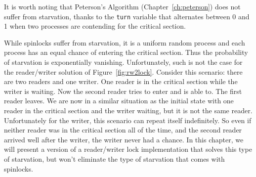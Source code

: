 \documentclass{report}
\begin{document}
It is worth noting that Peterson's Algorithm (Chapter~\ref{ch:peterson})
does not suffer from starvation, thanks to the \texttt{turn} variable
that alternates between 0 and 1 when two processes are contending for
the critical section.

While spinlocks suffer from starvation, it is a uniform random
process and each process has an equal chance of entering the critical
section.  Thus the probability of starvation is exponentially vanishing.
Unfortunately, such is not the case for the
reader/writer solution of Figure~\ref{fig:rw2lock}.
Consider this scenario: there are two readers and one writer.  One reader
is in the critical section while the writer is waiting.  Now the
second reader tries to enter and is able to.  The first reader leaves.
We are now in a similar situation as the initial state with one reader
in the critical section and the writer waiting, but it is not the same
reader.  Unfortunately for the writer, this scenario can repeat itself
indefinitely.  So even if neither reader was in the critical section
all of the time, and the second reader arrived well after the writer,
the writer never had a chance.
In this chapter, we will present a version of a reader/writer lock
implementation that solves this type of starvation, but won't eliminate
the type of starvation that comes with spinlocks.
\end{document}
